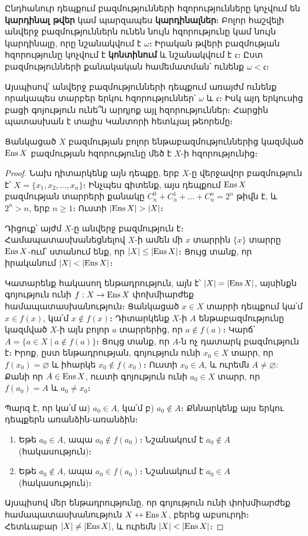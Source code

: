 \documentclass[./main.tex]{subfiles}
\begin{document}
\par Ընդհանուր դեպքում բազմությունների հզորությունները կոչվում են \textbf{կարդինալ թվեր} կամ պարզապես \textbf{կարդինալներ}։ Բոլոր հաշվելի անվերջ բազմություններն ունեն նույն հզորությունը կամ նույն կարդինալը, որը նշանակվում է $\omega$։ Իրական թվերի բազմության հզորությունը կոչվում է \textbf{կոնտինում} և նշանակվում է $\mathfrak{c}$։ Ըստ բազմությունների քանակական համեմատման՝ ունենք $\omega<\mathfrak{c}$։
\par Այսպիսով՝ անվերջ բազմությունների դեպքում առայժմ ունենք որակապես տար\-բեր երկու հզորություններ՝ $\omega$ և $\mathfrak{c}$։ Իսկ այդ երկուսից բացի գոյություն ունե՞ն արդյոք այլ հզորություններ։ Հարցին պատասխան է տալիս Կանտորի հետևյալ թեորեմը։
\begin{theorem}\label{ch3thm7}
Ցանկացած $X$ բազմության բոլոր ենթաբազմություններից կազմված $\operatorname{Ens} X$ բազմության հզորությունը մեծ է $X$-ի հզորությունից։
\end{theorem}
\begin{proof}
Նախ դիտարկենք այն դեպքը, երբ $X$-ը վերջավոր բազմություն է՝ $X=\{x_1,x_2,\dots,x_n\}$։ Ինչպես գիտենք, այս դեպքում $\operatorname{Ens} X$ բազմության տարրերի քանակը $C_n^0+C_n^1+\dots+C_n^n=2^n$ թիվն է, և $2^n>n$, երբ $n\geq 1$։ Ուստի $\lvert\operatorname{Ens} X\rvert>\lvert X\rvert$։
\par Դիցուք՝ այժմ $X$-ը անվերջ բազմություն է։ Համապատասխանեցնելով $X$-ի ամեն մի $x$ տարրին $\{x\}$ տարրը $\operatorname{Ens} X$-ում՝ ստանում ենք, որ $\lvert X\rvert\leq \lvert\operatorname{Ens} X\rvert$։ Ցույց տանք, որ իրականում $\lvert X\rvert<\lvert\operatorname{Ens} X\rvert$։
\par Կատարենք հակասող ենթադրություն, այն է՝  $\lvert X\rvert=\lvert\operatorname{Ens} X\rvert$, այսինքն գոյու\-թյուն ունի $f:X\rightarrow \operatorname{Ens} X$ փոխմիարժեք համապատասխանություն։ Ցանկացած $x\in X$ տարրի դեպքում կա՛մ $x\in f(x)$, կա՛մ $x\not\in f(x)$։ Դիտարկենք $X$-ի $A$ ենթաբազմու\-թյունը կազմված $X$-ի այն բոլոր $a$ տարրերից, որ $a\not \in f(a)$։ Կարճ՝ $A=\{a\in X\mid a\not\in f(a)\}$։ Ցույց տանք, որ $A$-ն ոչ դատարկ բազմություն է։ Իրոք, ըստ ենթադրության, գոյություն ունի $x_0\in X$ տարր, որ $f(x_0)=\varnothing$ և իհարկե $x_0\not \in f(x_0)$։ Ուստի $x_0\in A$, և ուրեմն $A\neq \varnothing$: Քանի որ $A\in \operatorname{Ens} X$, ուստի գոյություն ունի $a_0\in X$ տարր, որ $f(a_0)=A$ և $a_0\neq x_0$։
\par Պարզ է, որ կա՛մ ա) $a_0\in A$, կա՛մ բ) $a_0\not\in A$։ Քննարկենք այս երկու դեպքերն առանձին-առանձին։
\begin{enumerate}
    \item[ա)] Եթե $a_0\in A$, ապա $a_0\not\in f(a_0)$։ Նշանակում է $a_0\not\in A$ (հակասություն)։
    \item[բ)] Եթե $a_0\not\in A$, ապա $a_0\in f(a_0)$։ Նշանակում է $a_0\in A$ (հակասություն)։
\end{enumerate}
\par Այսպիսով մեր ենթադրությունը, որ գոյություն ունի փոխմիարժեք հա\-մա\-պա\-տաս\-խա\-նութ\-յուն $X\leftrightarrow \operatorname{Ens} X$, բերեց աբսուրդի։ Հետևաբար $\lvert X\rvert \neq \lvert\operatorname{Ens} X\rvert$, և ուրեմն $\lvert X\rvert < \lvert\operatorname{Ens} X\rvert$։\qedhere
\end{proof}
\end{document}
